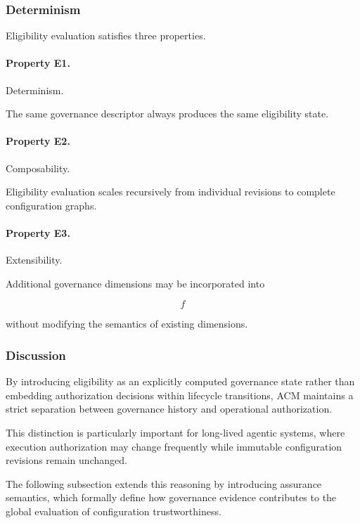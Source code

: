 \documentclass[10pt]{article}
\begin{document}
\subsubsection{Determinism}

Eligibility evaluation satisfies three properties.

\paragraph{Property E1.}

Determinism.

The same governance descriptor always produces the same eligibility state.

\paragraph{Property E2.}

Composability.

Eligibility evaluation scales recursively from individual revisions to complete
configuration graphs.

\paragraph{Property E3.}

Extensibility.

Additional governance dimensions may be incorporated into

\[
f
\]

without modifying the semantics of existing dimensions.

\subsubsection{Discussion}

By introducing eligibility as an explicitly computed governance state rather
than embedding authorization decisions within lifecycle transitions, ACM
maintains a strict separation between governance history and operational
authorization.

This distinction is particularly important for long-lived agentic systems,
where execution authorization may change frequently while immutable
configuration revisions remain unchanged.

The following subsection extends this reasoning by introducing assurance
semantics, which formally define how governance evidence contributes to the
global evaluation of configuration trustworthiness.
\end{document}
